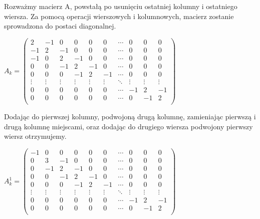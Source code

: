 Rozważmy macierz A, powstałą po usunięciu ostatniej kolumny i ostatniego wiersza. Za pomocą operacji wierszowych i kolumnowych, macierz zostanie sprowadzona do postaci diagonalnej.
\begin{center}

$A_{k}=\begin{pmatrix}
2  & -1 &  0 & 0 & 0 & 0 & \cdots & 0 & 0 & 0 \\
-1 &  2 & -1 & 0 & 0 & 0 & \cdots & 0 & 0 & 0 \\
-1 &  0 &  2 &-1 & 0 & 0 & \cdots & 0 & 0 & 0 \\
 0 &  0 & -1 & 2 &-1 & 0 & \cdots & 0 & 0 & 0 \\
 0 &  0 &  0 &-1 & 2 &-1 & \cdots & 0 & 0 & 0 \\
 \vdots  &  \vdots &  \vdots &  \vdots &  \vdots &  \vdots & \ddots &  \vdots   & \vdots   &  \vdots\\
 0 &  0 &  0 & 0 & 0 & 0 & \cdots &-1 & 2 &-1 \\
 0 &  0 &  0 & 0 & 0 &0  & \cdots & 0 &-1 & 2 \\
\end{pmatrix}$

\end{center}
Dodając do pierwszej kolumny, podwojoną drugą kolumnę, zamieniając pierwszą i drugą kolumnę miejscami, oraz dodając do drugiego wiersza podwojony pierwszy wiersz otrzymujemy. 
 \begin{center}
 

$A_{k}^{1} = \begin{pmatrix}
-1 &  0 &  0 & 0 & 0 & 0 & \cdots & 0 & 0 & 0 \\
 0 &  3 & -1 & 0 & 0 & 0 & \cdots & 0 & 0 & 0 \\
 0 & -1 &  2 &-1 & 0 & 0 & \cdots & 0 & 0 & 0 \\
 0 &  0 & -1 & 2 &-1 & 0 & \cdots & 0 & 0 & 0 \\
 0 &  0 &  0 &-1 & 2 &-1 & \cdots & 0 & 0 & 0 \\
 \vdots  &  \vdots &  \vdots &  \vdots &  \vdots &  \vdots & \ddots &  \vdots   & \vdots   &  \vdots\\
 0 &  0 &  0 & 0 & 0 & 0 & \cdots &-1 & 2 &-1 \\
 0 &  0 &  0 & 0 & 0 &0  & \cdots & 0 &-1 & 2 \\
\end{pmatrix}$
 \end{center}
 

